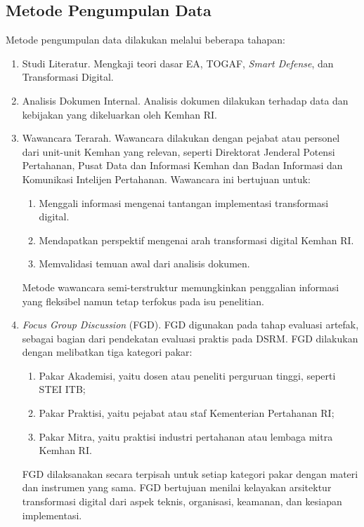 \subsection{Metode Pengumpulan Data}
Metode pengumpulan data dilakukan melalui beberapa tahapan:
\begin{enumerate}
  \item Studi Literatur.
  Mengkaji teori dasar EA, TOGAF, \textit{Smart Defense}, dan Transformasi Digital.
  \item Analisis Dokumen Internal.
  Analisis dokumen dilakukan terhadap data dan kebijakan yang dikeluarkan oleh Kemhan RI.
  \item Wawancara Terarah.
  Wawancara dilakukan dengan pejabat atau personel dari unit-unit Kemhan yang relevan, seperti Direktorat Jenderal Potensi Pertahanan, Pusat Data dan Informasi Kemhan dan Badan Informasi dan Komunikasi Intelijen Pertahanan. Wawancara ini bertujuan untuk:
  \begin{enumerate}
    \item Menggali informasi mengenai tantangan implementasi transformasi digital.
    \item Mendapatkan perspektif mengenai arah transformasi digital Kemhan RI.
    \item Memvalidasi temuan awal dari analisis dokumen.
  \end{enumerate}
  Metode wawancara semi-terstruktur memungkinkan penggalian informasi yang fleksibel namun tetap terfokus pada isu penelitian.
  \item \textit{Focus Group Discussion} (FGD).
  FGD digunakan pada tahap evaluasi artefak, sebagai bagian dari pendekatan evaluasi praktis pada DSRM. FGD dilakukan dengan melibatkan tiga kategori pakar:
  \begin{enumerate}
    \item Pakar Akademisi, yaitu dosen atau peneliti perguruan tinggi, seperti STEI ITB;
    \item Pakar Praktisi, yaitu pejabat atau staf Kementerian Pertahanan RI;
    \item Pakar Mitra, yaitu praktisi industri pertahanan atau lembaga mitra Kemhan RI.
  \end{enumerate}
  FGD dilaksanakan secara terpisah untuk setiap kategori pakar dengan materi dan instrumen yang sama.
  FGD bertujuan menilai kelayakan arsitektur transformasi digital dari aspek teknis, organisasi, keamanan, dan kesiapan implementasi.
\end{enumerate}


